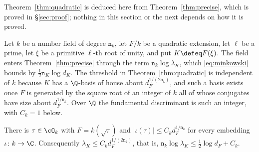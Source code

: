 \documentclass[11pt, reqno, twoside, letterpaper]{amsart}
\newcommand{\dk}{{\mathtt{n}_k}}
\newcommand{\dK}{{\mathtt{n}_K}}
\newcommand{\auxp}{\ell}
\newcommand{\rou}{\xi}
\newcommand{\lamK}{\lambda_{\Kf}}
\newcommand{\Kf}{K}
\begin{document}
Theorem~\ref{thm:quadratic} is deduced here from
Theorem~\ref{thm:precise}, which is proved in \S\ref{sec:proof};
nothing in this section or the next depends on how it is proved.

Let $k$ be a number field of degree $\dk$, let $F/k$ be a quadratic
extension, let $\auxp$ be a prime, let $\rou$ be a primitive
$\auxp$-th root of unity, and put $\Kf\defeq F(\rou)$. The field
enters Theorem~\ref{thm:precise} through the term $\dk\log\lamK$,
which \eqref{eq:minkowski} bounds by $\tfrac12\dK\log d_\Kf$. The
threshold in Theorem~\ref{thm:quadratic} is independent of $k$
because $\Kf$ has a $\Q$-basis of house about $d_F^{1/(2\dk)}$, and
such a basis exists once $F$ is generated by the square root of an
integer of $k$ all of whose conjugates have size about $d_F^{1/\dk}$.
Over $\Q$ the fundamental discriminant is such an integer, with
$C_k=1$ below.

\begin{lemma}\label{lem:generator}
There is $\tau\in\cO_k$ with $F=k(\sqrt\tau)$ and
$|\iota(\tau)|\le C_kd_F^{1/\dk}$ for every embedding
$\iota\colon k\to\C$. Consequently $\lamK\le C_kd_F^{1/(2\dk)}$, that
is, $\dk\log\lamK\le\tfrac12\log d_F+C_k$.
\end{lemma}
\end{document}
